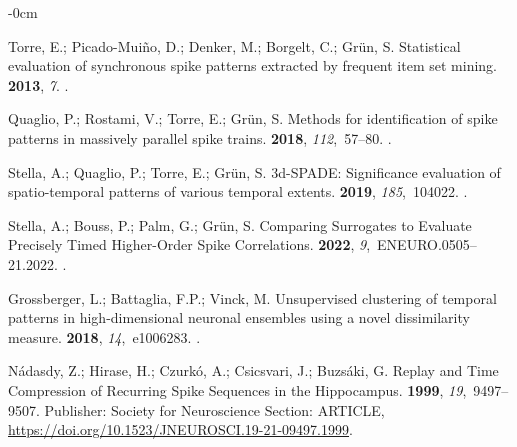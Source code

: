 \documentclass[brainsci, %
               review,submit,pdftex,moreauthors
               ]{Definitions/mdpi}
\begin{document}
\begin{adjustwidth}{-\extralength}{0cm}
\begin{thebibliography}{999}
  Torre, E.; Picado-Muiño, D.; Denker, M.; Borgelt, C.; Grün, S.
  \newblock Statistical evaluation of synchronous spike patterns extracted by
    frequent item set mining.
   {\bf 2013}, {\em 7}.
  .
  
  Quaglio, P.; Rostami, V.; Torre, E.; Grün, S.
  \newblock Methods for identification of spike patterns in massively parallel
    spike trains.
   {\bf 2018}, {\em 112},~57--80.
  .
  
  Stella, A.; Quaglio, P.; Torre, E.; Grün, S.
  \newblock 3d-{SPADE}: {Significance} evaluation of spatio-temporal patterns of
    various temporal extents.
   {\bf 2019}, {\em 185},~104022.
  .
  
  Stella, A.; Bouss, P.; Palm, G.; Grün, S.
  \newblock Comparing {Surrogates} to {Evaluate} {Precisely} {Timed}
    {Higher}-{Order} {Spike} {Correlations}.
   {\bf 2022}, {\em 9},~ENEURO.0505--21.2022.
  .
  
  Grossberger, L.; Battaglia, F.P.; Vinck, M.
  \newblock Unsupervised clustering of temporal patterns in high-dimensional
    neuronal ensembles using a novel dissimilarity measure.
   {\bf 2018}, {\em 14},~e1006283.
  .
  
  Nádasdy, Z.; Hirase, H.; Czurkó, A.; Csicsvari, J.; Buzsáki, G.
  \newblock Replay and {Time} {Compression} of {Recurring} {Spike} {Sequences} in
    the {Hippocampus}.
   {\bf 1999}, {\em 19},~9497--9507.
  \newblock Publisher: Society for Neuroscience Section: ARTICLE,
    {\url{https://doi.org/10.1523/JNEUROSCI.19-21-09497.1999}}.
  

\end{thebibliography}
\end{adjustwidth}
\end{document}
